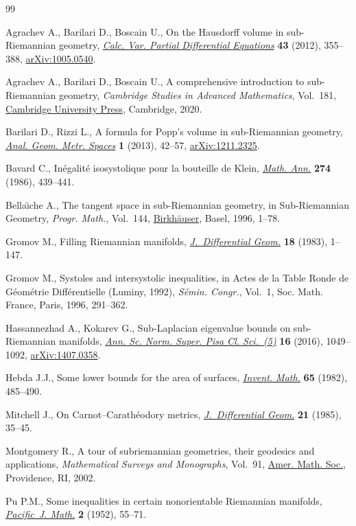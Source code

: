 \documentclass[10pt,a4paper]{amsart}
\numberwithin{equation}{section}
\begin{document}
\begin{thebibliography}{99}
\footnotesize\itemsep=0pt

Agrachev A., Barilari D., Boscain U., On the {H}ausdorff volume in
 sub-{R}iemannian geometry, \href{https://doi.org/10.1007/s00526-011-0414-y}{\textit{Calc. Var. Partial Differential Equations}}
 \textbf{43} (2012), 355--388, \href{https://arxiv.org/abs/1005.0540}{arXiv:1005.0540}.

Agrachev A., Barilari D., Boscain U., A comprehensive introduction to
 sub-{R}iemannian geometry, \textit{Cambridge Studies in Advanced
 Mathematics}, Vol.~181, \href{https://doi.org/10.1017/9781108677325}{Cambridge University Press}, Cambridge, 2020.

Barilari D., Rizzi L., A formula for {P}opp's volume in sub-{R}iemannian
 geometry, \href{https://doi.org/10.2478/agms-2012-0004}{\textit{Anal. Geom. Metr. Spaces}} \textbf{1} (2013), 42--57,
 \href{https://arxiv.org/abs/1211.2325}{arXiv:1211.2325}.

Bavard C., In\'egalit\'e isosystolique pour la bouteille de {K}lein,
 \href{https://doi.org/10.1007/BF01457227}{\textit{Math. Ann.}} \textbf{274} (1986), 439--441.

Bella\"{\i}che A., The tangent space in sub-{R}iemannian geometry, in
 Sub-{R}iemannian Geometry, \textit{Progr. Math.}, Vol.~144, \href{https://doi.org/10.1007/978-3-0348-9210-0_1}{Birkh\"auser},
 Basel, 1996, 1--78.

Gromov M., Filling {R}iemannian manifolds, \href{https://doi.org/10.4310/jdg/1214509283}{\textit{J.~Differential Geom.}}
 \textbf{18} (1983), 1--147.

Gromov M., Systoles and intersystolic inequalities, in Actes de la {T}able
 {R}onde de {G}\'eom\'etrie {D}iff\'erentielle ({L}uminy, 1992),
 \textit{S\'emin. Congr.}, Vol.~1, Soc. Math. France, Paris, 1996, 291--362.

Hassannezhad A., Kokarev G., Sub-{L}aplacian eigenvalue bounds on
 sub-{R}iemannian manifolds, \href{https://doi.org/10.2422/2036-2145.201409_005}{\textit{Ann. Sc. Norm. Super. Pisa Cl. Sci.~(5)}}
 \textbf{16} (2016), 1049--1092, \href{https://arxiv.org/abs/1407.0358}{arXiv:1407.0358}.

Hebda J.J., Some lower bounds for the area of surfaces, \href{https://doi.org/10.1007/BF01396632}{\textit{Invent. Math.}}
 \textbf{65} (1982), 485--490.

Mitchell J., On {C}arnot--{C}arath\'eodory metrics, \href{https://doi.org/10.4310/jdg/1214439462}{\textit{J.~Differential
 Geom.}} \textbf{21} (1985), 35--45.

Montgomery R., A tour of subriemannian geometries, their geodesics and
 applications, \textit{Mathematical Surveys and Monographs}, Vol.~91, \href{https://doi.org/10.1090/surv/091}{Amer.
 Math. Soc.}, Providence, RI, 2002.

Pu P.M., Some inequalities in certain nonorientable {R}iemannian manifolds,
 \href{https://doi.org/10.2140/pjm.1952.2.55}{\textit{Pacific~J. Math.}} \textbf{2} (1952), 55--71.

\end{thebibliography}
\end{document}
